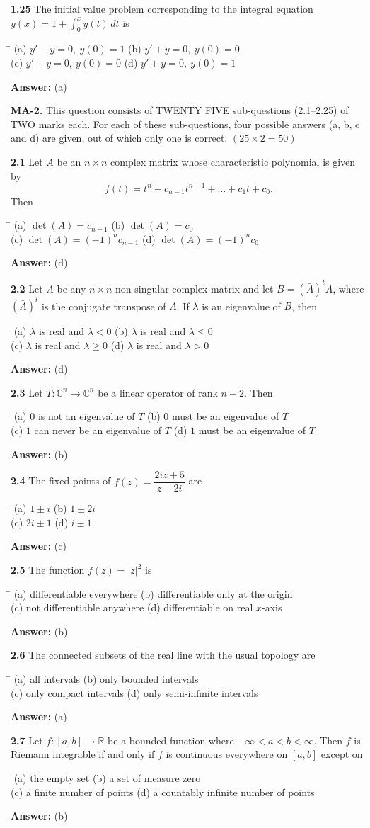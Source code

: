 \documentclass[11pt,a4paper]{article}
\newcommand{\optsfour}[4]{%
  \begin{tabbing}
    \hspace{0.48\linewidth}\=\kill
    (a) #1 \> (b) #2 \\[2pt]
    (c) #3 \> (d) #4
  \end{tabbing}%
}
\newcommand{\ans}[1]{\textbf{Answer:} #1\par\medskip}
\begin{document}
\textbf{1.25} The initial value problem corresponding to the integral equation $y(x) = 1 + \displaystyle\int_0^x y(t)\,dt$ is
\optsfour{$y' - y = 0,\ y(0) = 1$}{$y' + y = 0,\ y(0) = 0$}{$y' - y = 0,\ y(0) = 0$}{$y' + y = 0,\ y(0) = 1$}
\ans{(a)}

\bigskip

\textbf{MA-2.} This question consists of TWENTY FIVE sub-questions (2.1--2.25) of TWO marks each. For each of these sub-questions, four possible answers (a, b, c and d) are given, out of which only one is correct. \hfill $(25 \times 2 = 50)$

\medskip

\textbf{2.1} Let $A$ be an $n \times n$ complex matrix whose characteristic polynomial is given by
\[
  f(t) = t^n + c_{n-1}t^{n-1} + \dots + c_1 t + c_0.
\]
Then
\optsfour{$\det(A) = c_{n-1}$}{$\det(A) = c_0$}{$\det(A) = (-1)^n c_{n-1}$}{$\det(A) = (-1)^n c_0$}
\ans{(d)}

\textbf{2.2} Let $A$ be any $n \times n$ non-singular complex matrix and let $B = (\bar{A})^t A$, where $(\bar{A})^t$ is the conjugate transpose of $A$. If $\lambda$ is an eigenvalue of $B$, then
\optsfour{$\lambda$ is real and $\lambda < 0$}{$\lambda$ is real and $\lambda \le 0$}{$\lambda$ is real and $\lambda \ge 0$}{$\lambda$ is real and $\lambda > 0$}
\ans{(d)}

\textbf{2.3} Let $T : \mathbb{C}^n \to \mathbb{C}^n$ be a linear operator of rank $n - 2$. Then
\optsfour{$0$ is not an eigenvalue of $T$}{$0$ must be an eigenvalue of $T$}{$1$ can never be an eigenvalue of $T$}{$1$ must be an eigenvalue of $T$}
\ans{(b)}

\textbf{2.4} The fixed points of $f(z) = \dfrac{2iz + 5}{z - 2i}$ are
\optsfour{$1 \pm i$}{$1 \pm 2i$}{$2i \pm 1$}{$i \pm 1$}
\ans{(c)}

\textbf{2.5} The function $f(z) = |z|^2$ is
\optsfour{differentiable everywhere}{differentiable only at the origin}{not differentiable anywhere}{differentiable on real $x$-axis}
\ans{(b)}

\textbf{2.6} The connected subsets of the real line with the usual topology are
\optsfour{all intervals}{only bounded intervals}{only compact intervals}{only semi-infinite intervals}
\ans{(a)}

\textbf{2.7} Let $f : [a, b] \to \mathbb{R}$ be a bounded function where $-\infty < a < b < \infty$. Then $f$ is Riemann integrable if and only if $f$ is continuous everywhere on $[a, b]$ except on
\optsfour{the empty set}{a set of measure zero}{a finite number of points}{a countably infinite number of points}
\ans{(b)}
\end{document}

